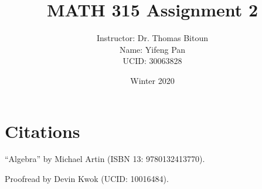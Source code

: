 \documentclass[10pt, letterpaper, titlepage]{article}
\title{MATH 315 Assignment 2}
\author{Instructor: Dr. Thomas Bitoun
    \\Name: Yifeng Pan
    \\UCID: 30063828}
\date{Winter 2020}
\begin{document}
    \maketitle

    
    \newpage
    
    \newpage
    
    \newpage
    
    \newpage
    

    \section*{Citations}
    ``Algebra'' by Michael Artin
    (ISBN 13: 9780132413770).

    Proofread by Devin Kwok
    (UCID: 10016484).
\end{document}
